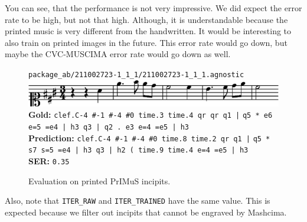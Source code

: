 You can see, that the performance is not very impressive. We did expect the error rate to be high, but not that high. Although, it is understandable because the printed music is very different from the handwritten. It would be interesting to also train on printed images in the future. This error rate would go down, but maybe the CVC-MUSCIMA error rate would go down as well.

\begin{figure}[h]
    \centering
    \verb`package_ab/211002723-1_1_1/211002723-1_1_1.agnostic`
    \\
    \medskip
    \includegraphics[width=140mm]{../img/evaluation-on-printed}
    \textbf{Gold:}
    \verb`clef.C-4 #-1 #-4 #0 time.3 time.4 qr qr q1 |`
    \verb`q5 * e6 e=5 =e4 | h3 q3 | q2 . e3 e=4 =e5 | h3`
    \\
    \medskip
    \textbf{Prediction:}
    \verb`clef.C-4 #-1 #-4 #0 time.8 time.2 qr q1 |`
    \verb`q5 * s7 s=5 =e4 | h3 q3 | h2 ( time.9 time.4 e=4 =e5 | h3`
    \\
    \medskip
    \textbf{SER:}
    \verb`0.35`
    \caption{Evaluation on printed PrIMuS incipits.}
    \label{fig6:EvaluatinoOnPrinted}
\end{figure}

Also, note that \verb`ITER_RAW` and \verb`ITER_TRAINED` have the same value. This is expected because we filter out incipits that cannot be engraved by Mashcima.
